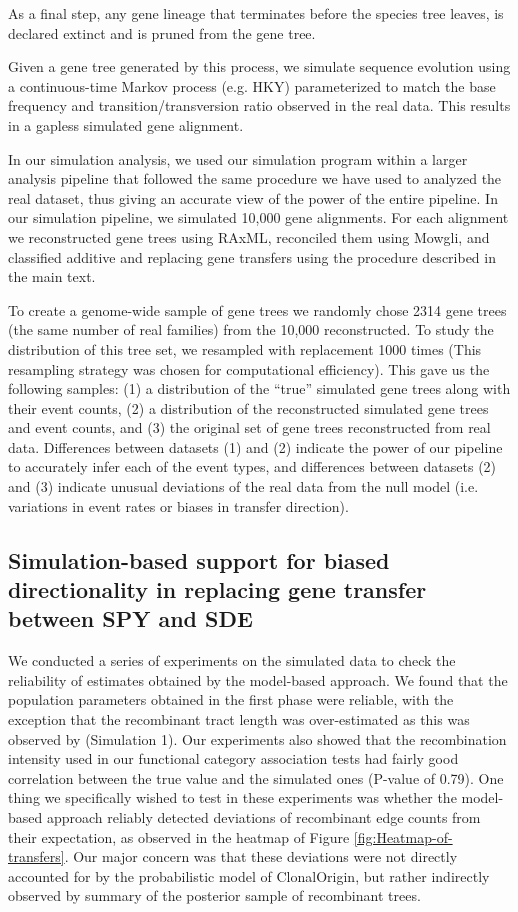 \documentclass[12pt]{article}
\begin{document}
As a final step, any gene lineage that terminates before the species tree
leaves, is declared extinct and is pruned from the gene tree.

Given a gene tree generated by this process, we simulate sequence
evolution using a continuous-time Markov process (e.g. HKY)
parameterized to match the base frequency and transition/transversion
ratio observed in the real data.  This results in a gapless simulated
gene alignment.

In our simulation analysis, we used our simulation program within a
larger analysis pipeline that followed the same procedure we have used
to analyzed the real dataset, thus giving an accurate view of the
power of the entire pipeline.  In our simulation pipeline, we
simulated 10,000 gene alignments.  For each alignment we reconstructed 
gene trees using RAxML, reconciled them using Mowgli, and classified
additive and replacing gene transfers using the procedure described in the
main text.

To create a genome-wide sample of gene trees we randomly chose 2314
gene trees (the same number of real families) from the 10,000
reconstructed.  To study the distribution of this tree set, we
resampled with replacement 1000 times (This resampling strategy was
chosen for computational efficiency).  This gave us the following
samples: (1) a distribution of the ``true'' simulated gene trees along
with their event counts, (2) a distribution of the reconstructed
simulated gene trees and event counts, and (3) the original set of
gene trees reconstructed from real data.  Differences between datasets
(1) and (2) indicate the power of our pipeline to accurately infer
each of the event types, and differences between datasets (2) and (3)
indicate unusual deviations of the real data from the null model
(i.e. variations in event rates or biases in transfer direction).



\subsection*{Simulation-based support for biased directionality
in replacing gene transfer between SPY and SDE}

We conducted a series of experiments on the simulated data to check the reliability
of estimates obtained by the model-based approach. We found that the population
parameters obtained in the first phase were reliable, with the exception that
the recombinant tract length was over-estimated as this was observed
by \citealp{Didelot2010} (Simulation 1). Our experiments also showed that the recombination
intensity used in our functional category association tests had fairly good
correlation between the true value and the simulated ones (P-value of 0.79).  
One thing we specifically wished to test in these experiments
was whether the model-based approach reliably detected deviations of recombinant
edge counts from their expectation, as observed in the heatmap of Figure
\ref{fig:Heatmap-of-transfers}. Our major concern was that these deviations
were not directly accounted for by the probabilistic model of ClonalOrigin, but
rather indirectly observed by summary of the posterior sample of recombinant
trees. 
\end{document}

